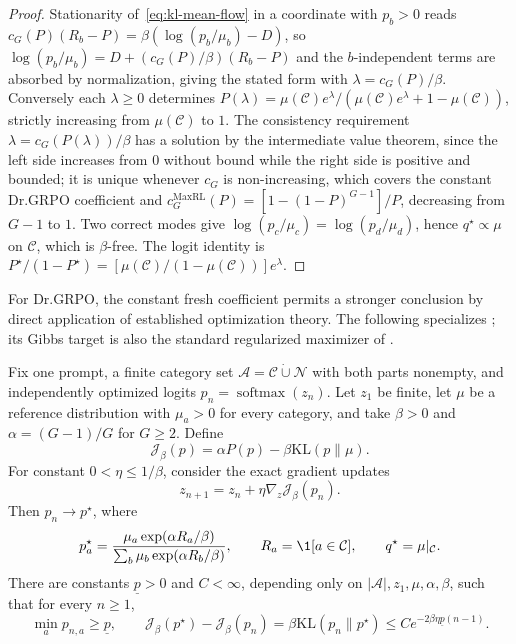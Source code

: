 \begin{proof}
\enforcehalffinalproseline
Stationarity of~\eqref{eq:kl-mean-flow} in a coordinate with $p_b>0$ reads
$c_G(P)(R_b-P)=\beta(\log(p_b/\mu_b)-D)$, so
$\log(p_b/\mu_b)=D+(c_G(P)/\beta)(R_b-P)$ and the $b$-independent terms are
absorbed by normalization, giving the stated form with $\lambda=c_G(P)/\beta$.
Conversely each $\lambda\ge0$ determines
$P(\lambda)=\mu(\mathcal C)e^\lambda/(\mu(\mathcal C)e^\lambda+1-\mu(\mathcal C))$,
strictly increasing from $\mu(\mathcal C)$ to $1$. The consistency requirement
$\lambda=c_G(P(\lambda))/\beta$ has a solution by the intermediate value
theorem, since the left side increases from $0$ without bound while the right
side is positive and bounded; it is unique whenever $c_G$ is non-increasing,
which covers the constant Dr.GRPO coefficient and
$c_G^{\mathrm{MaxRL}}(P)=[1-(1-P)^{G-1}]/P$, decreasing from $G-1$ to $1$.
Two correct modes give $\log(p_c/\mu_c)=\log(p_d/\mu_d)$, hence
$q^\star\propto\mu$ on $\mathcal C$, which is $\beta$-free. The logit identity
is $P^\star/(1-P^\star)=[\mu(\mathcal C)/(1-\mu(\mathcal C))]e^\lambda$.
\end{proof}

For Dr.GRPO, the constant fresh coefficient permits a stronger conclusion
by direct application of established optimization theory. The following
specializes \citet[Theorem~5 and Lemma~13]{mei2020softmaxpg}; its Gibbs
target is also the standard regularized maximizer of
\citet[Proposition~1]{geist2019regmdp}.

\begin{corollary}
\enforcehalffinalproseline
\label{cor:kl-dr-mei-convergence}
Fix one prompt, a finite category set
$\mathcal A=\mathcal C\mathbin{\dot\cup}\mathcal N$ with both parts
nonempty, and independently optimized logits $p_n=\operatorname{softmax}(z_n)$.
Let $z_1$ be finite, let $\mu$ be a reference distribution with
$\mu_a>0$ for every category, and take $\beta>0$ and
$\alpha=(G-1)/G$ for $G\ge2$. Define
\[
 \mathcal J_\beta(p)=\alpha P(p)-\beta\mathrm{KL}(p\|\mu).
\]
For constant $0<\eta\le1/\beta$, consider the exact gradient updates
\begin{equation}
 z_{n+1}=z_n+\eta\nabla_z\mathcal J_\beta(p_n).
 \label{eq:kl-dr-mei-update}
\end{equation}
Then $p_n\to p^\star$, where
\[
 p^\star_a=
 \frac{\mu_a\exp(\alpha R_a/\beta)}
      {\sum_b\mu_b\exp(\alpha R_b/\beta)},
 \qquad R_a=\1[a\in\mathcal C],
 \qquad q^\star=\mu|_{\mathcal C}.
\]
There are constants $\underline p>0$ and $C<\infty$, depending only on
$|\mathcal A|,z_1,\mu,\alpha,\beta$, such that for every $n\ge1$,
\begin{equation}
 \min_a p_{n,a}\ge\underline p,
 \qquad
 \mathcal J_\beta(p^\star)-\mathcal J_\beta(p_n)
 =\beta\mathrm{KL}(p_n\|p^\star)
 \le C e^{-2\beta\eta\underline p(n-1)}.
 \label{eq:kl-dr-mei-rate}
\end{equation}
\end{corollary}

